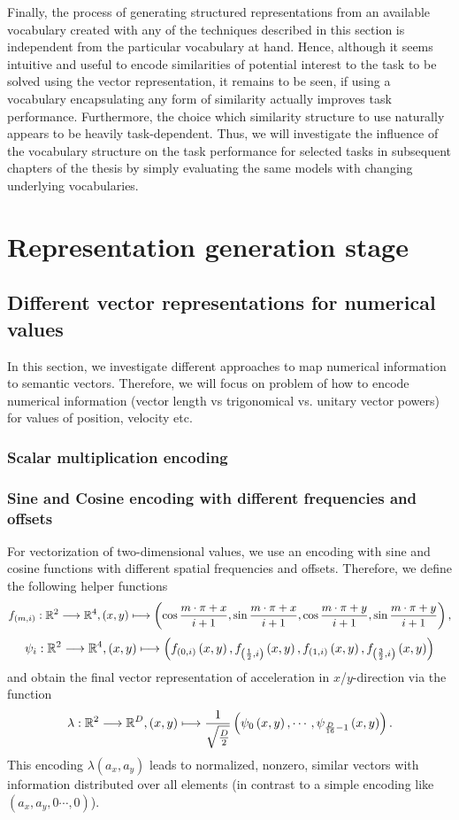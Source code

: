 Finally, the process of generating structured representations from an available vocabulary created with any of the techniques described in this section is independent from the particular vocabulary at hand.
Hence, although it seems intuitive and useful to encode similarities of potential interest to the task to be solved using the vector representation, it remains to be seen, if using a vocabulary encapsulating any form of similarity actually improves task performance.
Furthermore, the choice which similarity structure to use naturally appears to be heavily task-dependent.
Thus, we will investigate the influence of the vocabulary structure on the task performance for selected tasks in subsequent chapters of the thesis by simply evaluating the same models with changing underlying vocabularies.

\section{Representation generation stage}%
\label{sec:representation_generation_stage}


\subsection{Different vector representations for numerical values}%
\label{subsec:different_vector_representations_for_numerical_values}


In this section, we investigate different approaches to map numerical information to semantic vectors.
Therefore, we will focus on
problem of how to encode numerical information (vector length vs trigonomical vs. unitary vector powers) for values of position, velocity etc.
\subsubsection{Scalar multiplication encoding}
\subsubsection{Sine and Cosine encoding with different frequencies and offsets}
For vectorization of two-dimensional values, we use an encoding with sine and cosine functions with different spatial frequencies and offsets.
Therefore, we define the following helper functions
\[ f_{\left(m,i\right)}: \mathbb{R}^2 \longrightarrow \mathbb{R}^4, \left(x,y\right) \longmapsto \left(\cos\frac{m\cdot \pi + x}{i + 1}, \sin\frac{m\cdot \pi + x}{i + 1}, \cos\frac{m\cdot \pi + y}{i + 1}, \sin\frac{m\cdot \pi + y}{i + 1}\right),
\]
\[
\psi_i: \mathbb{R}^2 \longrightarrow \mathbb{R}^4, \left(x,y\right) \longmapsto \left(f_{\left(0,i\right)}\left(x,y\right), f_{\left(\frac{1}{2},i\right)}\left(x,y\right), f_{\left(1,i\right)}\left(x,y\right), f_{\left(\frac{3}{2},i\right)}\left(x,y\right)\right)
\]
and obtain the final vector representation of acceleration in $x$/$y$-direction via the function
\[
\lambda: \mathbb{R}^2 \longrightarrow \mathbb{R}^D, \left(x,y\right) \longmapsto \frac{1}{\sqrt{\frac{D}{2}}}\left(\psi_0\left(x,y\right), \cdots, \psi_{\frac{D}{16}-1}\left(x,y\right)\right).
\]
This encoding $\lambda\left(a_x, a_y\right)$ leads to normalized, nonzero, similar vectors with information distributed over all elements (in contrast to a simple encoding like $\left(a_x, a_y, 0 \cdots, 0\right)$).
